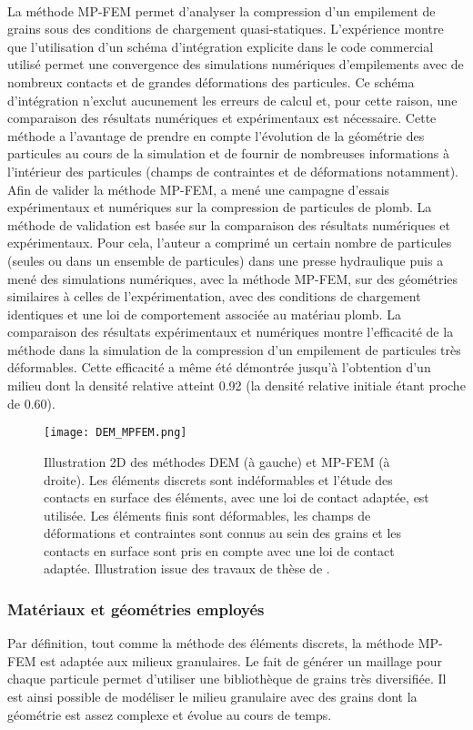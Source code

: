 			\\La méthode MP-FEM permet d'analyser la compression d'un empilement de grains sous des conditions de chargement quasi-statiques. L'expérience montre que l'utilisation d'un schéma d'intégration explicite dans le code commercial utilisé permet une convergence des simulations numériques d'empilements avec de nombreux contacts et de grandes déformations des particules. Ce schéma d'intégration n'exclut aucunement les erreurs de calcul et, pour cette raison, une comparaison des résultats numériques et expérimentaux est nécessaire. Cette méthode a l'avantage de prendre en compte l'évolution de la géométrie des particules au cours de la simulation et de fournir de nombreuses informations à l'intérieur des particules (champs de contraintes et de déformations notamment).
			\\Afin de valider la méthode MP-FEM, \citeauthor{chen_contribution_2008} \cite{chen_contribution_2008} a mené une campagne d'essais expérimentaux et numériques sur la compression de particules de plomb. La méthode de validation est basée sur la comparaison des résultats numériques et expérimentaux. Pour cela, l'auteur a comprimé un certain nombre de particules (seules ou dans un ensemble de particules) dans une presse hydraulique puis a mené des simulations numériques, avec la méthode MP-FEM, sur des géométries similaires à celles de l'expérimentation, avec des conditions de chargement identiques et une loi de comportement associée au matériau plomb. La comparaison des résultats expérimentaux et numériques montre l'efficacité de la méthode dans la simulation de la compression d'un empilement de particules très déformables. Cette efficacité a même été démontrée jusqu'à l'obtention d'un milieu dont la densité relative atteint \num{0.92} (la densité relative initiale étant proche de \num{0.60}).
			\begin{figure}\centering
				\texttt{[image: DEM\_MPFEM.png]}
				\caption{\label{fig03:DEM_MPFEM}Illustration 2D des méthodes DEM (à gauche) et MP-FEM (à droite). Les éléments discrets sont indéformables et l'étude des contacts en surface des éléments, avec une loi de contact adaptée, est utilisée. Les éléments finis sont déformables, les champs de déformations et contraintes sont connus au sein des grains et les contacts en surface sont pris en compte avec une loi de contact adaptée. Illustration issue des travaux de thèse de \citet{harthong_modelisation_2010}.}
			\end{figure}
		\subsubsection{Matériaux et géométries employés}
			Par définition, tout comme la méthode des éléments discrets, la méthode MP-FEM est adaptée aux milieux granulaires. Le fait de générer un maillage pour chaque particule permet d'utiliser une bibliothèque de grains très diversifiée. Il est ainsi possible de modéliser le milieu granulaire avec des grains dont la géométrie est assez complexe et évolue au cours de temps.
